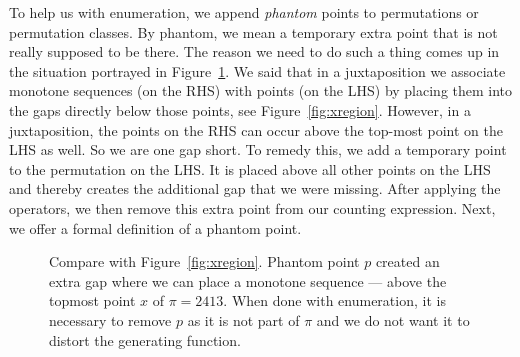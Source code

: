 \documentclass[12pt, a4paper, twoside]{report}
\begin{document}
To help us with enumeration, we append \emph{phantom} points to permutations or permutation classes. By phantom, we mean a temporary extra point that is not really supposed to be there. The reason we need to do such a thing comes up in the situation portrayed in Figure~\ref{fig:illustrate_phantom_pt}. We said that in a juxtaposition we associate monotone sequences (on the RHS) with points (on the LHS) by placing them into the gaps directly below those points, see Figure~\ref{fig:xregion}. However, in a juxtaposition, the points on the RHS can occur above the top-most point on the LHS as well. So we are one gap short. To remedy this, we add a temporary point to the permutation on the LHS. It is placed above all other points on the LHS and thereby creates the additional gap that we were missing. After applying the operators, we then remove this extra point from our counting expression. Next, we offer a formal definition of a phantom point.
\begin{figure}[ht!]
 \centering
  \caption{Compare with Figure~\ref{fig:xregion}. Phantom point $p$ created an extra gap where we can place a monotone sequence --- above the topmost point $x$ of $\pi=2413$. When done with enumeration, it is necessary to remove $p$ as it is not part of $\pi$ and we do not want it to distort the generating function.}
  \label{fig:illustrate_phantom_pt}
\end{figure}
\end{document}

